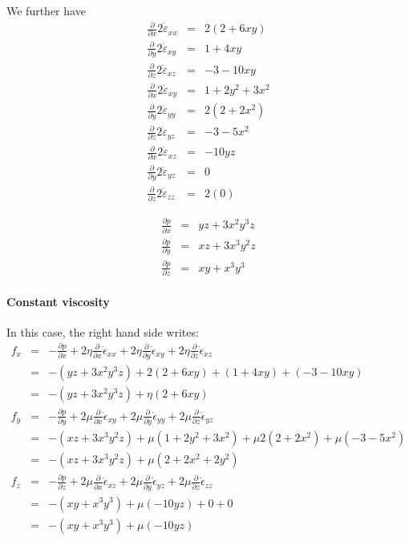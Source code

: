 We further have
\begin{eqnarray}
\frac{\partial}{\partial x} 2\dot{\varepsilon}_{xx}&=& 2(2 +6xy) \nonumber\\ 
\frac{\partial}{\partial y} 2\dot{\varepsilon}_{xy}&=&  1+4xy \nonumber\\
\frac{\partial}{\partial z} 2\dot{\varepsilon}_{xz}&=& -3 -10xy   \nonumber\\ 
\frac{\partial}{\partial x} 2\dot{\varepsilon}_{xy}&=& 1+2y^2+3x^2 \nonumber\\ 
\frac{\partial}{\partial y} 2\dot{\varepsilon}_{yy}&=& 2( 2+2x^2 ) \nonumber\\ 
\frac{\partial}{\partial z} 2\dot{\varepsilon}_{yz}&=& -3-5x^2   \nonumber\\
\frac{\partial}{\partial x} 2\dot{\varepsilon}_{xz}&=& -10yz \nonumber\\ 
\frac{\partial}{\partial y} 2\dot{\varepsilon}_{yz}&=& 0  \nonumber\\ 
\frac{\partial}{\partial z} 2\dot{\varepsilon}_{zz}&=& 2( 0 ) \nonumber
\end{eqnarray}

\begin{eqnarray}
\frac{\partial p}{\partial x} &=& yz+3x^2y^3z\\
\frac{\partial p}{\partial y} &=& xz +3x^3y^2z \\
\frac{\partial p}{\partial z} &=& xy+x^3y^3
\end{eqnarray}



\paragraph{Constant viscosity}
In this case, the right hand side writes:
\begin{eqnarray}
f_x 
&=& 
-\frac{\partial p}{\partial x} 
+2\eta\frac{\partial}{\partial x} \dot{\epsilon}_{xx}
+2\eta\frac{\partial}{\partial y} \dot{\epsilon}_{xy}
+2\eta\frac{\partial}{\partial z} \dot{\epsilon}_{xz} \nonumber\\
&=&
-(yz+3x^2y^3z)
+ 2(2 +6xy) + (1+4xy) + (-3 -10xy)   \\
&=&
-(yz+3x^2y^3z)
+\eta(2+6xy ) \\
f_y 
&=&  
-\frac{\partial p}{\partial y} 
+2\mu\frac{\partial}{\partial x} \dot{\epsilon}_{xy}
+2\mu\frac{\partial}{\partial y} \dot{\epsilon}_{yy}
+2\mu\frac{\partial}{\partial z} \dot{\epsilon}_{yz}  \nonumber\\
&=&
-(xz +3x^3y^2z)
+
\mu(1+2y^2+3x^2)
+\mu2( 2+2x^2 )  
+\mu(-3-5x^2) \\
&=&
-(xz +3x^3y^2z)
+ \mu ( 2 + 2x^2 +  2y^2)
\\ 
f_z 
&=&
-\frac{\partial p}{\partial z} 
+2\mu\frac{\partial}{\partial x} \dot{\epsilon}_{xz}
+2\mu\frac{\partial}{\partial y} \dot{\epsilon}_{yz}
+2\mu\frac{\partial}{\partial z} \dot{\epsilon}_{zz}  \nonumber\\
&=&
-(xy+x^3y^3) 
+ \mu (-10yz) + 0 + 0 \\
&=&
-(xy+x^3y^3) 
+\mu (-10yz) 
\end{eqnarray}

